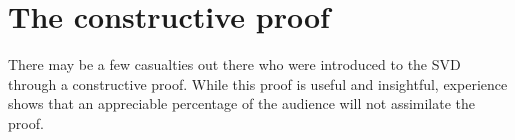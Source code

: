 \section{The constructive proof}
There may be a few casualties out there who were introduced to the SVD through a constructive proof. While this proof is useful and insightful, experience shows that an appreciable percentage of the audience will not assimilate the proof. 

\endinput